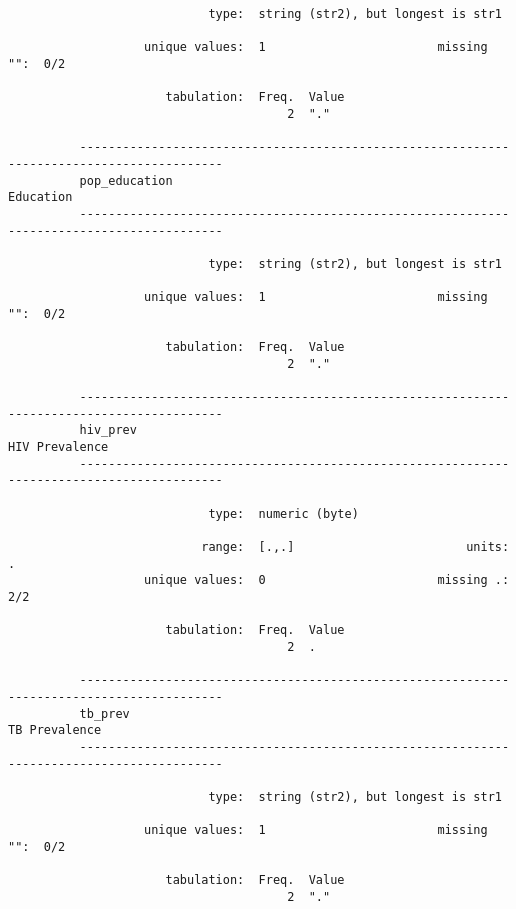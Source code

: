\documentclass{article}
\begin{document}
\begin{verbatim}
                            type:  string (str2), but longest is str1
          
                   unique values:  1                        missing "":  0/2
          
                      tabulation:  Freq.  Value
                                       2  "."
          
          ------------------------------------------------------------------------------------------
          pop_education                                                                    Education
          ------------------------------------------------------------------------------------------
          
                            type:  string (str2), but longest is str1
          
                   unique values:  1                        missing "":  0/2
          
                      tabulation:  Freq.  Value
                                       2  "."
          
          ------------------------------------------------------------------------------------------
          hiv_prev                                                                    HIV Prevalence
          ------------------------------------------------------------------------------------------
          
                            type:  numeric (byte)
          
                           range:  [.,.]                        units:  .
                   unique values:  0                        missing .:  2/2
          
                      tabulation:  Freq.  Value
                                       2  .
          
          ------------------------------------------------------------------------------------------
          tb_prev                                                                      TB Prevalence
          ------------------------------------------------------------------------------------------
          
                            type:  string (str2), but longest is str1
          
                   unique values:  1                        missing "":  0/2
          
                      tabulation:  Freq.  Value
                                       2  "."
          

\end{verbatim}
\end{document}
